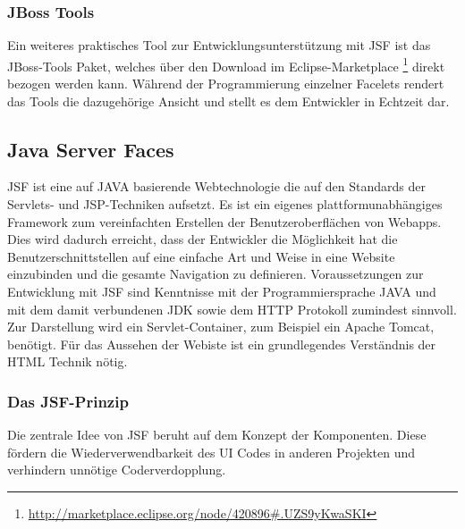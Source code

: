 \documentclass[12pt, twoside, a4paper, ngerman]{article}
\newcommand{\iz}[2]{#1 {\renewcommand{\baselinestretch}{1}\footnote{#2}}} %
\renewcommand{\baselinestretch}{1.5}
\begin{document}
\subsubsection{JBoss Tools}
Ein weiteres praktisches Tool zur Entwicklungsunterstützung mit \ac{JSF} ist das JBoss-Tools Paket, welches über den Download im \iz{Eclipse-Marketplace}{\url{http://marketplace.eclipse.org/node/420896\#.UZS9yKwaSKI}} direkt bezogen werden kann.
Während der Programmierung einzelner Facelets rendert das Tools die dazugehörige Ansicht und stellt es dem Entwickler in Echtzeit dar. 

\subsection{Java Server Faces}

JSF ist eine auf JAVA basierende Webtechnologie die auf den Standards der Servlets- und JSP-Techniken aufsetzt.
Es ist ein eigenes plattformunabhängiges Framework zum vereinfachten Erstellen der Benutzeroberflächen von Webapps.
Dies wird dadurch erreicht, dass der Entwickler die Möglichkeit hat die Benutzerschnittstellen auf eine einfache Art und Weise in eine Website einzubinden und die gesamte Navigation zu definieren.
Voraussetzungen zur Entwicklung mit JSF sind Kenntnisse mit der Programmiersprache JAVA und mit dem damit verbundenen \gls{JDK} sowie dem \gls{HTTP} Protokoll zumindest sinnvoll.
Zur Darstellung wird ein Servlet-Container, zum Beispiel ein Apache Tomcat, benötigt.
Für das Aussehen der Webiste ist ein grundlegendes Verständnis der HTML Technik nötig.

\subsubsection{Das JSF-Prinzip}

Die zentrale Idee von JSF beruht auf dem Konzept der Komponenten. Diese fördern die Wiederverwendbarkeit des UI Codes in anderen Projekten und verhindern unnötige Coderverdopplung.
\end{document}
